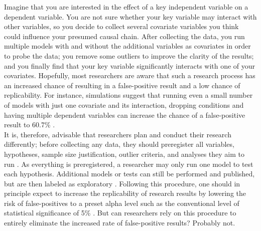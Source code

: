 Imagine that you are interested in the effect of a key independent variable on a dependent variable. You are not sure whether your key variable may interact with other variables, so you decide to collect several covariate variables you think could influence your presumed causal chain. After collecting the data, you run multiple models with and without the additional variables as covariates in order to probe the data; you remove some outliers to improve the clarity of the results; and you finally find that your key variable significantly interacts with one of your covariates. Hopefully, most researchers are aware that such a research process has an increased chance of resulting in a false-positive result and a low chance of replicability. For instance, simulations suggest that running even a small number of models with just one covariate and its interaction, dropping conditions and having multiple dependent variables can increase the chance of a false-positive result to 60.7\% \citep{Simmons2011}.\\

It is, therefore, advisable that researchers plan and conduct their research differently; before collecting any data, they should preregister all variables, hypotheses, sample size justification, outlier criteria, and analyses they aim to run \citep{VANTVEER20162,Pham2020,Simmons2020}. As everything is preregistered, a researcher may only run one model to test each hypothesis. Additional models or tests can still be performed and published, but are then labeled as exploratory \citep{Nosek2018}. Following this procedure, one should in principle expect to increase the replicability of research results by lowering the risk of false-positives to a preset alpha level such as the conventional level of statistical significance of 5\% \citep{Moore2016}. But can researchers rely on this procedure to entirely eliminate the increased rate of false-positive results? Probably not. \\

